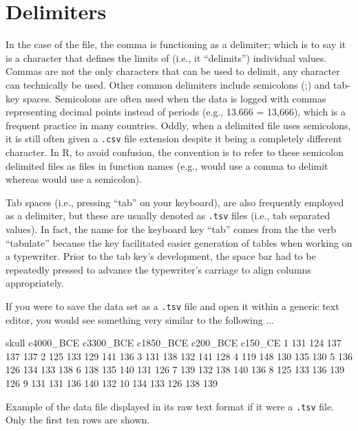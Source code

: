 \section{Delimiters}

In the case of the  file, the comma is functioning as a \gls{delimiter}; which is to say it is a character that defines the limits of (i.e., it ``delimits'') individual values. Commas are not the only characters that can be used to delimit, any character can technically be used. Other common delimiters include semicolons (;) and tab-key spaces. Semicolons are often used when the data is logged with commas representing decimal points instead of periods (e.g., 13.666 = 13,666), which is a frequent practice in many countries. Oddly, when a delimited file uses semicolons, it is still often given a \texttt{.csv} file extension despite it being a completely different character.  In R, to avoid confusion, the convention is to refer to these semicolon delimited files as  files in function names (e.g.,  would use a comma to delimit whereas  would use a semicolon).

Tab spaces (i.e., pressing ``tab'' on your keyboard), are also frequently employed as a delimiter, but these are usually denoted as \texttt{.tsv} files (i.e., tab separated values). In fact, the name for the keyboard key ``tab'' comes from the the verb ``tabulate'' because the key facilitated easier generation of tables when working on a typewriter. Prior to the tab key's development, the space bar had to be repeatedly pressed to advance the typewriter's carriage to align columns appropriately. 

If you were to save the  data set as a \texttt{.tsv} file and open it within a generic text editor, you would see something very similar to the following ...

\vspace{1em}
\begin{listing}[H]
\begin{raw}
skull	c4000_BCE	c3300_BCE	c1850_BCE	c200_BCE	c150_CE
1	131	124	137	137	137
2	125	133	129	141	136
3	131	138	132	141	128
4	119	148	130	135	130
5	136	126	134	133	138
6	138	135	140	131	126
7	139	132	138	140	136
8	125	133	136	139	126
9	131	131	136	140	132
10	134	133	126	138	139
\end{raw}
\caption*{Example of the  data file displayed in its raw text format if it were a \texttt{.tsv} file. Only the first ten rows are shown.}
\end{listing}
\vspace{1em}

